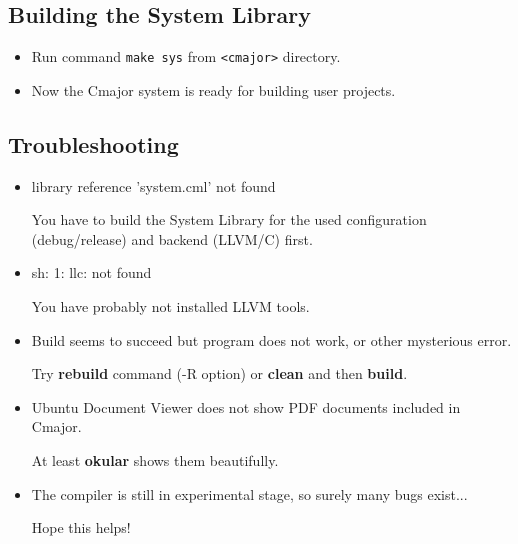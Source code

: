 \documentclass[oneside, a4paper, 11pt]{article}
\begin{document}
\subsection{Building the System Library}

\begin{itemize}

\item
Run command \verb|make sys| from \verb|<cmajor>| directory.

\item
Now the Cmajor system is ready for building user projects.

\end{itemize}

\subsection{Troubleshooting}

\begin{itemize}

\item
library reference 'system.cml' not found

You have to build the System Library for the used configuration (debug/release) and backend (LLVM/C) first.

\item
sh: 1: llc: not found

You have probably not installed LLVM tools.

\item
Build seems to succeed but program does not work, or other mysterious error.

Try \textbf{rebuild} command (-R option) or \textbf{clean} and then \textbf{build}.

\item
Ubuntu Document Viewer does not show PDF documents included in Cmajor.

At least \textbf{okular} shows them beautifully.

\item
The compiler is still in experimental stage, so surely many bugs exist...

Hope this helps!
\end{itemize}
\end{document}
